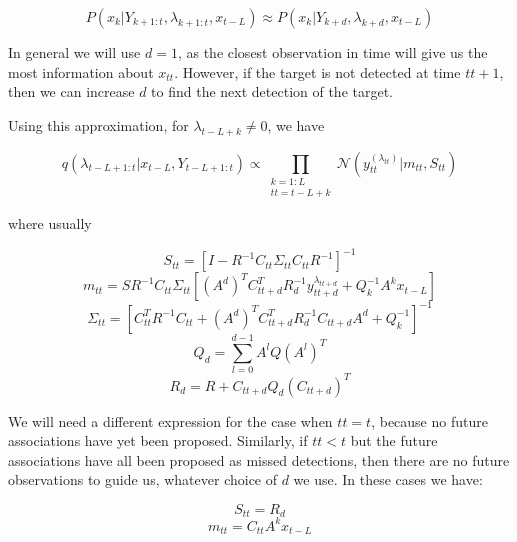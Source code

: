 \begin{equation}
P(x_k|Y_{k+1:t}, \lambda_{k+1:t}, x_{t-L}) \approx P(x_k|Y_{k+d}, \lambda_{k+d}, x_{t-L})
\label{eq:}
\end{equation}

In general we will use $d=1$, as the closest observation in time will give us the most information about $x_{tt}$. However, if the target is not detected at time $tt+1$, then we can increase $d$ to find the next detection of the target.

Using this approximation, for $\lambda_{t-L+k} \ne 0$, we have

\begin{equation}
q(\lambda_{t-L+1:t}|x_{t-L}, Y_{t-L+1:t}) \propto \prod_{\substack{k=1:L\\tt=t-L+k}} \mathcal{N}(y_{tt}^{(\lambda_{tt})}|m_{tt}, S_{tt})
\end{equation}

where usually

\begin{equation} S_{tt} = [ I - R^{-1} C_{tt} \Sigma_{tt} C_{tt} R^{-1} ]^{-1} \label{eq:} \end{equation}
\begin{equation} m_{tt} = S R^{-1} C_{tt} \Sigma_{tt} [ (A^d)^T C_{tt+d}^T R_d^{-1} y_{tt+d}^{\lambda_{tt+d}} + Q_k^{-1} A^k x_{t-L} ] \label{eq:} \end{equation}
\begin{equation} \Sigma_{tt} = [ C_{tt}^T R^{-1} C_{tt} + (A^d)^T C_{tt+d}^T R_d^{-1} C_{tt+d} A^d + Q_k^{-1}]^{-1} \label{eq:} \end{equation}
\begin{equation} Q_d = \sum_{l=0}^{d-1} {A^l Q (A^l)^T} \label{eq:} \end{equation}
\begin{equation} R_d = R + C_{tt+d} Q_d (C_{tt+d})^T \label{eq:} \end{equation}

We will need a different expression for the case when $tt=t$, because no future associations have yet been proposed. Similarly, if $tt<t$ but the future associations have all been proposed as missed detections, then there are no future observations to guide us, whatever choice of $d$ we use. In these cases we have:

\begin{equation} S_{tt} = R_d \end{equation}
\begin{equation} m_{tt} = C_{tt} A^k x_{t-L} \label{eq:} \end{equation}

